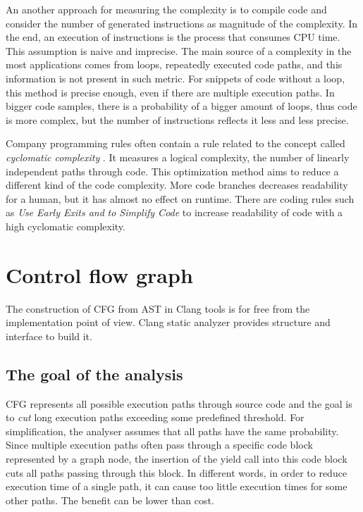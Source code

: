 An another approach for measuring the complexity is to compile code and consider the number of generated instructions as magnitude of the complexity. In the end, an execution of instructions is the process that consumes CPU time. This assumption is naive and imprecise. The main source of a complexity in the most applications comes from loops, repeatedly executed code paths, and this information is not present in such metric. For snippets of code without a loop, this method is precise enough, even if there are multiple execution paths. In bigger code samples, there is a probability of a bigger amount of loops, thus code is more complex, but the number of instructions reflects it less and less precise.

Company programming rules often contain a rule related to the concept called \emph{cyclomatic complexity} \cite{cyclomatic-complexity}. It measures a logical complexity, the number of linearly independent paths through code. This optimization method aims to reduce a different kind of the code complexity. More code branches decreases readability for a human, but it has almost no effect on runtime. There are coding rules such as \emph{Use Early Exits and} \emph{} \emph{to Simplify Code} \cite{llvm-coding-standards} to increase readability of code with a high cyclomatic complexity.

\section{Control flow graph}
The construction of CFG from AST in Clang tools is for free from the implementation point of view. Clang static analyzer provides structure and interface to build it.

\subsection{The goal of the analysis}
CFG represents all possible execution paths through source code and the goal is to \textit{cut} long execution paths exceeding some predefined threshold. For simplification, the analyser assumes that all paths have the same probability. Since multiple execution paths often pass through a specific code block represented by a graph node, the insertion of the yield call into this code block cuts all paths passing through this block. In different words, in order to reduce execution time of a single path, it can cause too little execution times for some other paths. The benefit can be lower than cost.

